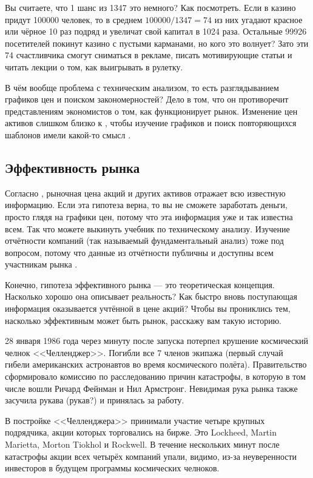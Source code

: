 Вы считаете, что 1 шанс из 1347 это немного? Как посмотреть. Если в казино 
придут \num{100000} человек, то в среднем $\num{100000}/1347 = 74$ из них 
угадают красное или чёрное 10 раз подряд и увеличат свой капитал в \num{1024} 
раза. Остальные \num{99926} посетителей покинут казино с пустыми карманами, но 
кого это волнует? Зато эти 74 счастливчика смогут сниматься в рекламе, писать 
мотивирующие статьи и читать лекции о том, как выигрывать в рулетку.

В чём вообще проблема с техническим анализом, то есть разглядыванием графиков
цен и поиском закономерностей? Дело в том, что он противоречит представлениям
экономистов о том, как функционирует рынок. Изменение цен активов слишком близко 
к , чтобы изучение графиков и поиск 
повторяющихся шаблонов имели какой-то смысл \cite[ch.~11.2]
{bodie2014investments}.

\subsection{Эффективность рынка}

Согласно , 
рыночная цена акций и других активов отражает всю известную информацию. Если 
эта гипотеза верна, то вы не сможете заработать деньги, просто глядя на графики 
цен, потому что эта информация уже и так известна всем. Так что можете выкинуть 
учебник по техническому анализу. Изучение отчётности компаний (так называемый 
фундаментальный анализ) тоже под вопросом, потому что данные из отчётности 
публичны и доступны всем участникам рынка \cite[ch.~11]
{bodie2014investments}.

Конечно, гипотеза эффективного рынка --- это теоретическая концепция. Насколько
хорошо она описывает реальность? Как быстро вновь поступающая информация
оказывается учтённой в цене акций? Чтобы вы прониклись тем, насколько 
эффективным может быть рынок, расскажу вам такую историю.

28 января 1986 года через минуту после запуска потерпел крушение 
космический челнок <<Челленджер>>. Погибли все 7 членов экипажа (первый случай 
гибели американских астронавтов во время космического полёта). Правительство 
сформировало комиссию по расследованию причин катастрофы, в которую в том числе 
вошли Ричард Фейнман и Нил Армстронг. Невидимая рука рынка также засучила 
рукава (рукав?) и принялась за работу. 

В постройке <<Челленджера>> принимали участие четыре крупных подрядчика, акции 
которых торговались на бирже. Это Lockheed, Martin Marietta, Morton Tiokhol и 
Rockwell. В течение нескольких минут после катастрофы акции всех четырёх 
компаний упали, видимо, из-за неуверенности инвесторов в будущем программы 
космических челноков.

